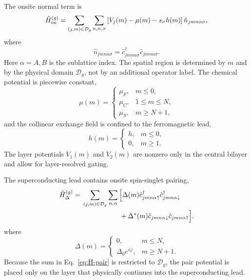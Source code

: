 The onsite normal term is
\begin{equation}
	\hat H_{\rm on}^{(g)}
	=
	\sum_{(j,m)\in\mathcal D_g}
	\sum_{n,\alpha,\sigma}
	\left[ V_j(m)-\mu(m)-s_\sigma h(m)\right]
	\hat n_{jmn\alpha\sigma},
	\label{eq:H-on}
\end{equation}
where
\begin{equation}
	\hat n_{jmn\alpha\sigma}
	=
	\hat c_{jmn\alpha\sigma}^{\dagger}
	\hat c_{jmn\alpha\sigma} .
\end{equation}
Here $\alpha=A,B$ is the sublattice index.  The spatial region is determined by $m$ and by the physical domain $\mathcal D_g$, not by an additional operator label.  The chemical potential is piecewise constant,
\begin{equation}
	\mu(m)=
	\begin{cases}
		\mu_F, & m\le0,       \\
		\mu_C, & 1\le m\le N, \\
		\mu_S, & m\ge N+1,
	\end{cases}
	\label{eq:mu-piecewise}
\end{equation}
and the collinear exchange field is confined to the ferromagnetic lead,
\begin{equation}
	h(m)=
	\begin{cases}
		h, & m\le0, \\
		0, & m\ge1.
	\end{cases}
	\label{eq:h-piecewise}
\end{equation}
The layer potentials $V_1(m)$ and $V_2(m)$ are nonzero only in the central bilayer and allow for layer-resolved gating.

The superconducting lead contains onsite spin-singlet pairing,
\begin{align}
	\hat H_\Delta^{(g)}
	={} &
	\sum_{(j,m)\in\mathcal D_g}
	\sum_{n,\alpha}
	\Big[
		\Delta(m)
		\hat c_{jmn\alpha\uparrow}^{\dagger}
		\hat c_{jmn\alpha\downarrow}^{\dagger}
	\notag               \\
	    & \hspace{5.5em}
		+
		\Delta^*(m)
		\hat c_{jmn\alpha\downarrow}
		\hat c_{jmn\alpha\uparrow}
		\Big].
	\label{eq:H-pair}
\end{align}
where
\begin{equation}
	\Delta(m)=
	\begin{cases}
		0,                     & m\le N,   \\
		\Delta_0 e^{i\varphi}, & m\ge N+1.
	\end{cases}
	\label{eq:Delta-piecewise}
\end{equation}
Because the sum in Eq.~\eqref{eq:H-pair} is restricted to $\mathcal D_g$, the pair potential is placed only on the layer that physically continues into the superconducting lead.

